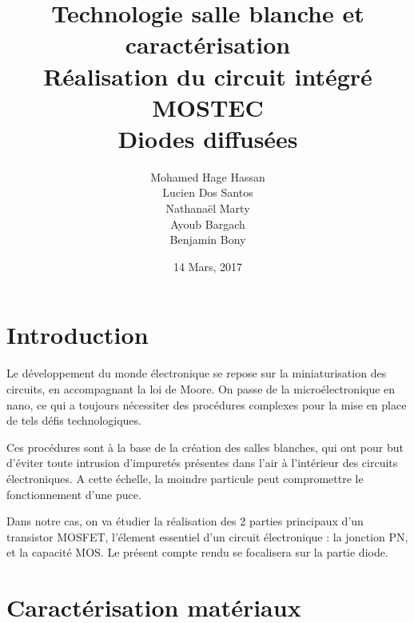 \documentclass[11pt]{article}
\begin{document}
\title{\textbf{Technologie salle blanche et caract\'erisation}\\ R\'ealisation du circuit int\'egr\'e MOSTEC \\ Diodes diffus\'ees}
\author{Mohamed Hage Hassan \\ Lucien Dos Santos \\ Nathanaël Marty \\ Ayoub Bargach \\ Benjamin Bony}
\date{14 Mars, 2017}
\maketitle

\tableofcontents
\clearpage

\section{Introduction}
Le d\'eveloppement du monde \'electronique se repose sur la miniaturisation des circuits, en accompagnant la loi de Moore. On passe de la micro\'electronique en nano, ce qui a toujours n\'ecessiter des proc\'edures complexes pour la mise en place de tels d\'efis technologiques. 

Ces proc\'edures sont \`a la base de la cr\'eation des salles blanches, qui ont pour but d'\'eviter toute intrusion d'impuret\'es pr\'esentes dans l'air \`a l'int\'erieur des circuits \'electroniques. A cette \'echelle, la moindre particule peut compromettre le fonctionnement d'une puce.

Dans notre cas, on va \'etudier la r\'ealisation des 2 parties principaux d'un transistor MOSFET, l'\'element essentiel d'un circuit \'electronique : la jonction PN, et la capacit\'e MOS. Le pr\'esent compte rendu se focalisera sur la partie diode.


\section{Caract\'erisation mat\'eriaux}
\end{document}
